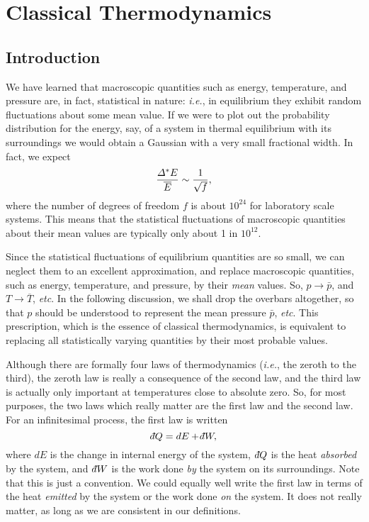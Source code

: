 \chapter{Classical Thermodynamics}

\section{Introduction}
We have learned that macroscopic quantities such as energy, temperature, and pressure
are, in fact, statistical in nature: {\em i.e.}, in equilibrium they exhibit random
fluctuations about some mean value. If we were to plot out the probability 
distribution for the energy, say, of a system in thermal equilibrium with its
surroundings we would obtain a Gaussian with a very small fractional width.
In fact, we expect
\begin{equation}
\frac{{\mit\Delta}^\ast E}{\overline{E}} \sim \frac{1}{\sqrt{f}},
\end{equation}
where the number of degrees of freedom $f$ is about $10^{24}$ for laboratory
scale systems. This means that the statistical fluctuations of macroscopic
quantities about their mean values are typically only about 1 in $10^{12}$.

Since the statistical fluctuations of equilibrium quantities are so small, we can
neglect them  to an excellent approximation, and replace macroscopic
quantities, such as  energy, temperature, and pressure, by their {\em mean}
values. So, $p\rightarrow \bar{p}$, and $T\rightarrow\overline{T}$, {\em etc}. 
In the following discussion, we shall drop the overbars altogether, so that $p$ should
be understood to represent the mean pressure $\bar{p}$, {\em etc}. This 
prescription, which is the essence of classical thermodynamics, is equivalent to
replacing all statistically varying quantities by their most probable values.


Although there are formally four laws of thermodynamics ({\em i.e.}, the zeroth to the
third), the zeroth law is really a consequence of the second law, and the third
law is actually only important at temperatures close to absolute zero. So, for
most purposes, the two laws which really matter are the first law and the second law.
For an infinitesimal process, the first law is written
\begin{equation}
\dbar Q = dE +\dbar W,
\end{equation}
where $dE$ is the change in internal energy of the system, \,$\dbar Q$ is the heat
{\em absorbed}\/ by the system, and \,$\dbar W$ is the work done 
{\em by}\/ the system on its surroundings. Note that this is
just a convention. We could equally well write the first law in terms of the heat
{\em emitted}\/ by the system or the work done {\em on}\/ the system. It does not 
really matter, as
long as we are consistent in our definitions.


